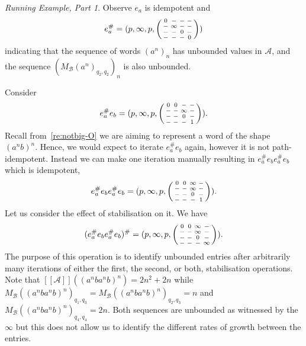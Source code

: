 \documentclass[10pt,a4paper]{amsart}
\theoremstyle{definition}
\numberwithin{equation}{section}
\theoremstyle{remark}
\newcommand{\autA}{\mathcal{A}}
\newcommand{\autB}{\mathcal{B}}
\newcommand{\brfunc}[1]{[\![#1]\!]}
\newcommand{\funcA}{\brfunc{\autA}}
\newcommand{\nopath}{-}
\newenvironment{smallpmatrix}
  {\left(\begin{smallmatrix}}
  {\end{smallmatrix}\right)}
\theoremstyle{remark}
\newtheorem{runningexample/}{Running Example, Part}
\newenvironment{runningexample}
  {\renewcommand{\qedsymbol}{\color{darkgray}\ensuremath{\lrcorner}}%
   \pushQED{\qed}\begin{runningexample/}}
  {\popQED\end{runningexample/}}
\begin{document}
\begin{runningexample}
Observe $e_a$ is idempotent and \[e_a^\#= (p,\infty,p,
\begin{smallpmatrix}
0 & \nopath & \nopath & \nopath\\
\nopath & \infty & \nopath & \nopath\\
\nopath & \nopath & 0 & \nopath\\
\nopath & \nopath & \nopath & 0
\end{smallpmatrix})\] indicating that the sequence of words $(a^n)_n$ has unbounded values in $\autA$, and the sequence $\left(M_{\autB}(a^n)_{q_2,q_2}\right)_n$ is also unbounded.

Consider \[e_a^\#e_b= (p,\infty,p,
\begin{smallpmatrix}
0 & 0 & \nopath & \nopath\\
\nopath & \nopath & \infty & \nopath\\
\nopath & \nopath & 0 & \nopath\\
\nopath & \nopath & \nopath & 1
\end{smallpmatrix}).\]
Recall from~\cref{re:notbig-O} we are aiming to represent a word of the shape $(a^nb)^n$. Hence, we would expect to iterate $e_a^\#e_b$ again, however it is not path-idempotent. Instead we can make one iteration manually resulting in $e_a^\#e_be_a^\#e_b$ which is idempotent,
\[e_a^\#e_be_a^\#e_b= (p,\infty,p,
\begin{smallpmatrix}
0 & 0 & \infty & \nopath\\
\nopath & \nopath & \infty & \nopath\\
\nopath & \nopath & 0 & \nopath\\
\nopath & \nopath & \nopath & 1
\end{smallpmatrix}).\]
Let us consider the effect of stabilisation on it. We have \[(e_a^\#e_be_a^\#e_b)^\#= (p,\infty,p,
\begin{smallpmatrix}
0 & 0 & \infty & \nopath \\
\nopath & \nopath & \infty & \nopath\\
\nopath & \nopath & 0 & \nopath\\
\nopath & \nopath & \nopath & \infty
\end{smallpmatrix}).\] 
The purpose of this operation is to identify unbounded entries after arbitrarily many iterations of either the first, the second, or both, stabilisation operations. Note that $\funcA((a^{n}ba^{n}b)^n) = 2n^2+2n$ while $M_{\autB}((a^{n}ba^{n}b)^n)_{q_1,q_3} =M_{\autB}((a^{n}ba^{n}b)^n)_{q_2,q_3}  =n$ and $M_{\autB}((a^{n}ba^{n}b)^n)_{q_4,q_4}= 2n$. Both sequences are unbounded as witnessed by the $\infty$ but this does not allow us to identify the different rates of growth between the entries. 
\end{runningexample}
\end{document}
